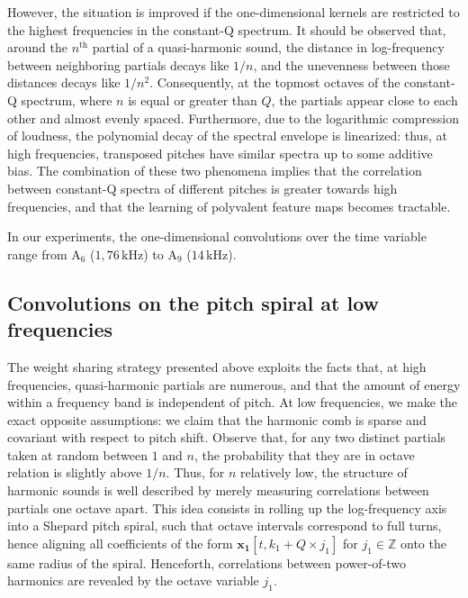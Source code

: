 \documentclass{article}
\begin{document}
However, the situation is improved if the one-dimensional
kernels are restricted to the highest frequencies in the constant-Q spectrum.
It should be observed that, around the $n^{\textrm{th}}$ partial of a quasi-harmonic sound,
the distance in log-frequency between neighboring partials decays like $1/n$,
and the unevenness between those distances decays like $1/n^2$.
Consequently, at the topmost octaves of the constant-Q spectrum, 
where $n$ is equal or greater than $Q$, the partials appear close to each other and almost
evenly spaced.
Furthermore, due to the logarithmic compression of loudness, the polynomial decay
of the spectral envelope is linearized: thus, at high frequencies, transposed pitches
have similar spectra up to some additive bias.
The combination of these two phenomena implies that the correlation between
constant-Q spectra of different pitches is greater towards high frequencies, and that
the learning of polyvalent feature maps becomes tractable.


In our experiments, the one-dimensional convolutions over the time variable
range from
$\mathrm{A_6}$ ($1,76\,\mathrm{kHz}$) to
$\mathrm{A_9}$ ($14\,\mathrm{kHz}$).

\subsection{Convolutions on the pitch spiral at low frequencies}
The weight sharing strategy presented above exploits the facts that,
at high frequencies, quasi-harmonic partials are numerous, and that the
amount of energy within a frequency band is independent of pitch.
At low frequencies, we make the exact opposite assumptions: we claim
that the harmonic comb is sparse and covariant with respect to pitch shift.
Observe that, for any two distinct partials taken at random between $1$ and $n$,
the probability that they are in octave relation is slightly above $1/n$.
Thus, for $n$ relatively low, the structure of harmonic sounds is well
described by merely measuring correlations between partials one octave apart.
This idea consists in rolling up the log-frequency axis into a Shepard pitch spiral,
such that octave intervals correspond to full turns, hence aligning all coefficients
of the form $\boldsymbol{x_1}[t, k_1 + Q \times j_1]$ for $j_1 \in \mathbb{Z}$
onto the same radius of the spiral.
Henceforth, correlations between power-of-two harmonics are revealed by
the octave variable $j_1$.
\end{document}
